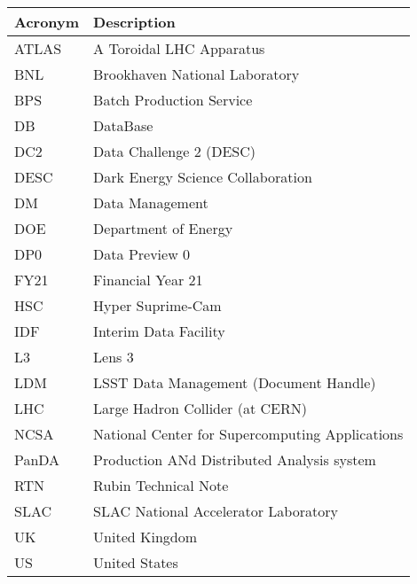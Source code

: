 \addtocounter{table}{-1}
\begin{longtable}{p{}p{}}\hline
\textbf{Acronym} & \textbf{Description}  \\\hline

ATLAS & A Toroidal LHC Apparatus \\\hline
BNL & Brookhaven National Laboratory \\\hline
BPS & Batch Production Service \\\hline
DB & DataBase \\\hline
DC2 & Data Challenge 2 (DESC) \\\hline
DESC & Dark Energy Science Collaboration \\\hline
DM & Data Management \\\hline
DOE & Department of Energy \\\hline
DP0 & Data Preview 0 \\\hline
FY21 & Financial Year 21 \\\hline
HSC & Hyper Suprime-Cam \\\hline
IDF & Interim Data Facility \\\hline
L3 & Lens 3 \\\hline
LDM & LSST Data Management (Document Handle) \\\hline
LHC & Large Hadron Collider (at CERN) \\\hline
NCSA & National Center for Supercomputing Applications \\\hline
PanDA &  Production ANd Distributed Analysis system \\\hline
RTN & Rubin Technical Note \\\hline
SLAC & SLAC National Accelerator Laboratory \\\hline
UK & United Kingdom \\\hline
US & United States \\\hline
\end{longtable}

